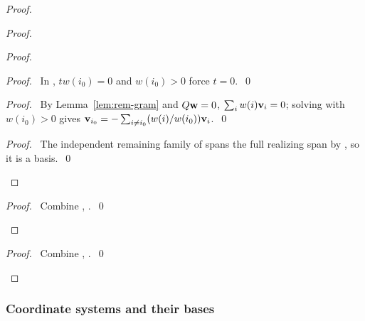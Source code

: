\begin{proof}
\begin{proof}
\begin{proof}
\begin{proof}\pf\ In , $tw(i_0)=0$ and $w(i_0)>0$
force $t=0$.~\qed\end{proof}
\begin{proof}\pf\ By Lemma~\ref{lem:rem-gram} and $Q{\mathbf w}=0$,
$\sum_i w(i){\mathbf v}_i=0$; solving with $w(i_0)>0$ gives
${\mathbf v}_{i_0}=-\sum_{i\ne i_0}(w(i)/w(i_0)){\mathbf v}_i$.~\qed\end{proof}
\qedstep
\begin{proof}\pf\ The independent remaining family of
 spans the full realizing span by
, so it is a basis.~\qed\end{proof}
\end{proof}
\qedstep
\begin{proof}\pf\ Combine , .~\qed\end{proof}
\end{proof}
\qedstep
\begin{proof}\pf\ Combine , .~\qed\end{proof}
\end{proof}

\subsubsection{Coordinate systems and their bases}\label{sec:rem-models}

